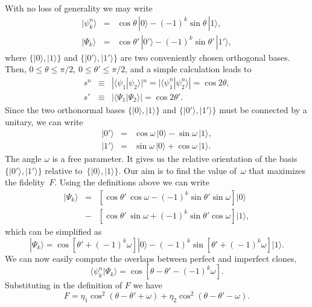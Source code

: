 \documentclass[aps,pra,twocolumn,showpacs]{revtex4-1}
\begin{document}
With no loss of generality we may write
%
\begin{eqnarray}
|\psi^n_k\rangle&=&\cos\theta\,|0\rangle-(-1)^k\sin\theta\,|1\rangle,\nonumber\\
|\Psi_k\rangle&=&\cos\theta'\,|0'\rangle-(-1)^k\sin\theta'\,|1'\rangle,
\end{eqnarray}
%
where $\{|0\rangle,|1\rangle\}$ and $\{|0'\rangle,|1'\rangle\}$ are two conveniently chosen orthogonal bases. Then, $0\le\theta\le\pi/2$, $0\le\theta'\le\pi/2$, and a simple calculation leads to
%
\begin{eqnarray}
s^n&\equiv&|\langle\psi_1|\psi_2\rangle|^n=|\langle\psi^n_1|\psi^n_2\rangle|=\cos2\theta,\nonumber\\[.5em]
s'&\equiv&|\langle\Psi_1|\Psi_2\rangle|=\cos2\theta'.
\label{eb ths = ss}
\end{eqnarray}
%
Since the two orthonormal bases $\{|0\rangle,|1\rangle\}$ and $\{|0'\rangle,|1'\rangle\}$ must be connected by a unitary, we can write
%
\begin{eqnarray}
|0'\rangle&=&\cos\omega\,|0\rangle-\sin\omega\,|1\rangle,\nonumber\\
|1'\rangle&=&\sin\omega\,|0\rangle+\cos\omega\,|1\rangle  .
\end{eqnarray}
%
The angle $\omega$ is a free parameter. It gives us the relative orientation of the basis $\{|0'\rangle,|1'\rangle\}$ relative to~$\{|0\rangle,|1\rangle\}$. Our aim is to find the value of~$\omega$ that maximizes the fidelity~$F$.
Using the definitions above we can write
%
\begin{eqnarray}
|\Psi_k\rangle&=&\left[\cos\theta'\,\cos\omega-(-1)^k\sin\theta'\sin\omega\right]|0\rangle\nonumber\\
&-&\left[\cos\theta'\,\sin\omega+(-1)^k\sin\theta'\cos\omega\right]|1\rangle ,
\end{eqnarray}
%
which can be simplified as
%
\begin{equation}
|\Psi_{\!k}\rangle\!\!=\!\cos\!\left[\theta'\!\!+\!(\!-1)^k\omega\right]\!|0\rangle\!-\!(\!-1)^k\!
\sin\!\left[\theta'\!\!+\!(\!-1)^k\omega\right]\!|1\rangle.
\end{equation}
%
We can now easily compute the overlaps between perfect and imperfect clones,
%
\begin{equation}
\langle\psi^n_k|\Psi_k\rangle=\cos\left[\theta-\theta'-(-1)^k\omega\right] .
\end{equation}
%
Substituting in  the definition of $F$ we have
%
\begin{equation}
F\!=\!\eta_1\cos^2\left(\theta\!-\!\theta'\!\!+\!\omega\right)+\eta_2\cos^2\left(\theta\!-\!\theta'\!\!-\!\omega\right) .
\end{equation}
\end{document}
